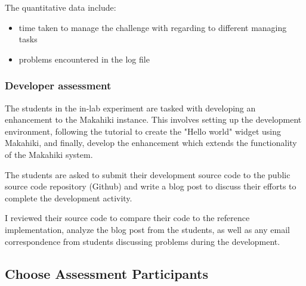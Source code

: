 The quantitative data include:
\begin{itemize}
 \item time taken to manage the challenge with regarding to different managing tasks
 \item problems encountered in the log file
\end{itemize}

\subsubsection{Developer assessment}

The students in the in-lab experiment are tasked with developing an enhancement to the Makahiki instance. This involves setting up the development environment, following the tutorial to create the "Hello world" widget using Makahiki, and finally, develop the enhancement which extends the functionality of the Makahiki system.

The students are asked to submit their development source code to the public source code repository (Github) and write a blog post to discuss their efforts to complete the development activity.

I reviewed their source code to compare their code to the reference implementation, analyze the blog post from the students, as well as any email correspondence from students discussing  problems during the development.

\subsection{Choose Assessment Participants}

